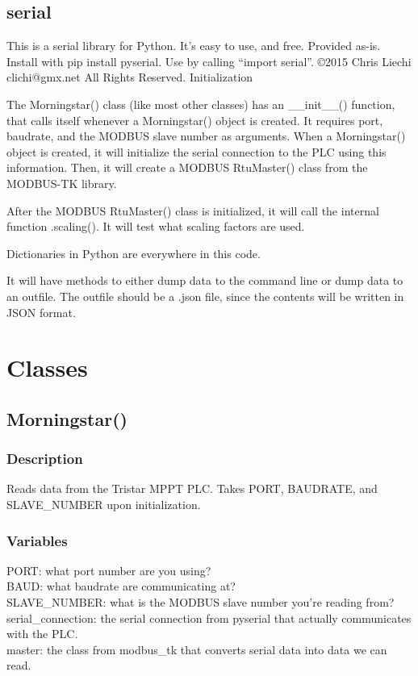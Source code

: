 \subsection{serial}
This is a serial library for Python. It’s easy to use, and free. Provided as-is. Install with pip install pyserial. Use by calling “import serial”. ©2015 Chris Liechi clichi@gmx.net  All Rights Reserved. 
Initialization

The Morningstar() class (like most other classes) has an \_\_init\_\_() function, that calls itself whenever a Morningstar() object is created. It requires port, baudrate, and the MODBUS slave number as arguments. When a Morningstar() object is created, it will initialize the serial connection to the PLC using this information. Then, it will create a MODBUS RtuMaster() class from the MODBUS-TK library.

After the MODBUS RtuMaster() class is initialized, it will call the internal function .scaling(). It will test what scaling factors are used.

Dictionaries in Python are everywhere in this code.

It will have methods to either dump data to the command line or dump data to an outfile. The outfile should be a .json file, since the contents will be written in JSON format.

\section{Classes}

\subsection{Morningstar()}

\subsubsection{Description}
Reads data from the Tristar MPPT PLC. Takes PORT, BAUDRATE, and SLAVE\_NUMBER upon initialization.

\subsubsection{Variables}

PORT: what port number are you using? \\
BAUD: what baudrate are communicating at? \\
SLAVE\_NUMBER: what is the MODBUS slave number you’re reading from? \\
serial\_connection: the serial connection from pyserial that actually communicates with the PLC. \\
master: the class from modbus\_tk that converts serial data into data we can read. \\

